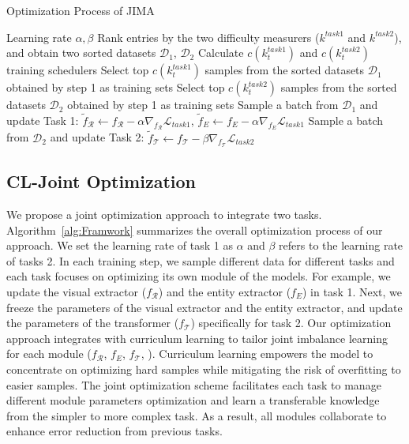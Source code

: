 \documentclass[sn-mathphys-num]{sn-jnl}%
\theoremstyle{thmstyleone}%
\theoremstyle{thmstyletwo}%
\theoremstyle{thmstylethree}%
\begin{document}
\begin{algorithm}
 \caption{Optimization Process of JIMA}
 \label{alg:Framwork}
 \begin{algorithmic}[1]
     \Require  Learning rate $\alpha, \beta $
      \State Rank entries by the two difficulty measurers ($k^{task1}$ and $k^{task2}$), and obtain two sorted datasets $\mathcal{D}_{1}$, $\mathcal{D}_{2}$
     \State Calculate $c(k_{t}^{task1})$ and $c(k_{t}^{task2})$ training schedulers
     \State Select top $c(k_{t}^{task1})$ samples from the sorted datasets $\mathcal{D}_{1}$ obtained by step 1 as training sets
      \State Select top $c(k_{t}^{task2})$ samples from the sorted datasets $\mathcal{D}_{2}$ obtained by step 1 as training sets
     \State Sample a batch from $\mathcal{D}_{1}$ and update Task 1:
     $\widetilde{f}_{\mathcal{R}}\gets f_{\mathcal{R}}-\alpha\nabla_{f_{\mathcal{R}}}\mathcal{L}_{task1}$, $\widetilde{f}_{E}\gets f_{E}-\alpha\nabla_{f_{E}}\mathcal{L}_{task1}$
     \State Sample a batch from $\mathcal{D}_{2}$ and update Task 2:
    $\widetilde{f}_{\mathcal{T}}\gets f_{\mathcal{T}}-\beta\nabla_{f_{\mathcal{T}}}\mathcal{L}_{task2}$
     \EndFor
\end{algorithmic}
\end{algorithm}


\subsection{CL-Joint Optimization}
We propose a joint optimization approach to integrate two tasks. 
Algorithm~\ref{alg:Framwork} summarizes the overall optimization process of our approach.
We set the learning rate of task 1 as $\alpha$ and $\beta$ refers to the learning rate of tasks 2.
In each training step, we sample different data for different tasks and each task focuses on optimizing its own module of the models. 
For example, we update the visual extractor ($f_{\mathcal{R}}$) and the entity extractor ($f_{E}$) in task 1. 
Next, we freeze the parameters of the visual extractor and the entity extractor, and update the parameters of the transformer ($f_{\mathcal{T}}$) specifically for task 2.
 Our optimization approach integrates with curriculum learning to tailor joint imbalance learning for each module ($f_\mathcal{R}$, $f_{E}$, $f_\mathcal{T}$, ). Curriculum learning empowers the model to concentrate on optimizing hard samples while mitigating the risk of overfitting to easier samples. The joint optimization scheme facilitates  each task to manage different module parameters optimization and learn a transferable knowledge from the simpler to more complex task. As a result, all modules collaborate to enhance error reduction from previous tasks.
\end{document}
